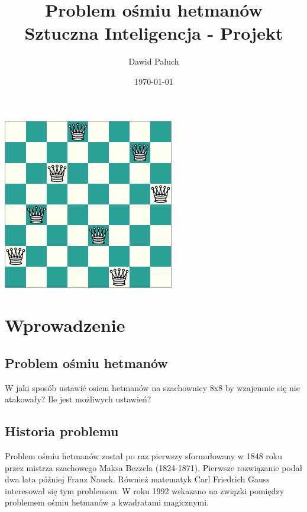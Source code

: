 \documentclass[12pt, twoside]{article}
\begin{document}
\title{\vspace{50mm}Problem ośmiu hetmanów \\
	\large Sztuczna Inteligencja - Projekt	
}

\author{Dawid Paluch}
\date{\today}
\maketitle

\begin{center}
	\includegraphics[keepaspectratio=true, scale=0.6]{8queens.png}
\end{center}
\thispagestyle{empty}
\clearpage
\setcounter{page}{1}

\clearpage
\tableofcontents
\clearpage

\setcounter{page}{3}
\section{Wprowadzenie}

\subsection{Problem ośmiu hetmanów}
W jaki sposób ustawić osiem hetmanów na szachownicy 8x8 by wzajemnie się nie atakowały? Ile jest możliwych ustawień?

\subsection{Historia problemu}
Problem ośmiu hetmanów został po raz pierwszy sformułowany w 1848 roku przez mistrza szachowego Maksa Bezzela (1824-1871). Pierwsze rozwiązanie podał dwa lata później Franz Nauck. Również matematyk Carl Friedrich Gauss interesował się tym problemem. W roku 1992 wskazano na związki pomiędzy problemem ośmiu hetmanów a kwadratami magicznymi.
\end{document}
